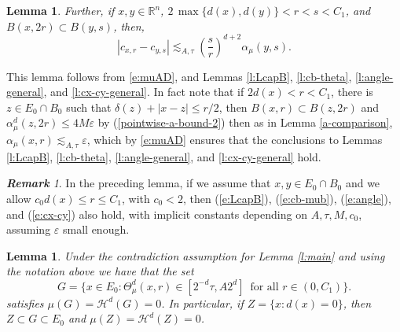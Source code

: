 \documentclass[11pt]{amsart}
\newcommand{\rf}[1]{{(\ref{#1})}}
\newcommand{\ve}{{\varepsilon}}
\newtheorem{lemma}[theorem]{Lemma}
\theoremstyle{definition}
\theoremstyle{remark}
\newtheorem{rem}[theorem]{\bf Remark}
\numberwithin{equation}{section}
\def\cH{{\mathcal{H}}}
\newcommand{\ps}[1]{\left( #1 \right)}
\newcommand{\av}[1]{\left| #1 \right|}
\def\lec{\lesssim}
\def\lec{\lesssim}
\begin{document}
\begin{lemma}
Further, if $x,y\in \mathbb{R}^{n}$, $2\,\max\{d(x),d(y)\}<r<s<C_{1}$, and $B(x,2r)\subset B(y,s)$, then,
		\begin{equation}
		\label{e:cx-cy}
		|c_{x,r}-c_{y,s}| \lec_{A,\tau} \ps{\frac{s}{r}}^{d+2}\alpha_{\mu}(y,s).
		\end{equation}
\end{lemma}

This lemma follows from \eqref{e:muAD}, and Lemmas \ref{l:LcapB}, \ref{l:cb-theta}, \ref{l:angle-general}, and \ref{l:cx-cy-general}. In fact note that if $2d(x)<r<C_1$, there is $z\in E_0\cap B_0$ such that 
$\delta(z)+|x-z|\le r/2$, then $B(x,r)\subset B(z,2r)$ and $\alpha_\mu^d(z,2r)\le 4M\ve$ by \rf{pointwise-a-bound-2} then as in Lemma \ref{a-comparison}, $\alpha_{\mu}(x,r)\lec_{A,\tau}\ve$,  which by
\eqref{e:muAD} ensures that the conclusions to Lemmas \ref{l:LcapB}, \ref{l:cb-theta}, \ref{l:angle-general}, and \ref{l:cx-cy-general} hold.

%

\begin{rem}\label{remark2}
In the preceding lemma, if we assume that $x,y\in E_0\cap B_0$ and we allow $c_0d(x)\le r\le C_{1}$, with $c_0<2$,
then \rf{e:LcapB}, \rf{e:cb-mub}, \rf{e:angle}, and \rf{e:cx-cy} also hold, with implicit constants
depending on $A,\tau,M,c_0$, assuming $\ve$ small enough.
\end{rem}

\begin{lemma}\label{l:good}
	Under the contradiction assumption for Lemma \ref{l:main} and using the notation above we have that the set 
	\begin{equation}\label{e:good}
	G=\{x\in {E_{0}}: \Theta^d_{\mu}(x,r)\in [2^{-d}\tau,A2^{d}] \,\mbox{ for all }r\in (0,C_{1})\}.
	\end{equation}
	satisfies $\mu(G)=\cH^{d}(G)=0$. In particular, if $Z=\{x:d(x)=0\}$, then $Z\subset G\subset E_0$ and $\mu(Z)=\cH^{d}(Z)=0$.
\end{lemma}
\end{document}
